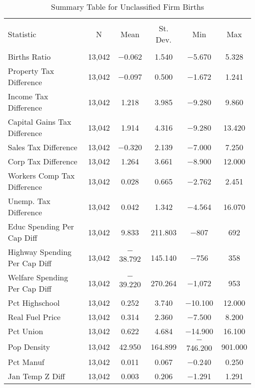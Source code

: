 
\begin{table}[!htbp] \centering 
  \caption{Summary Table for  Unclassified Firm Births} 
  \label{99summary} 
\begin{tabular}{@{\extracolsep{5pt}}lccccc} 
\\[-1.8ex]\hline 
\hline \\[-1.8ex] 
Statistic & \multicolumn{1}{c}{N} & \multicolumn{1}{c}{Mean} & \multicolumn{1}{c}{St. Dev.} & \multicolumn{1}{c}{Min} & \multicolumn{1}{c}{Max} \\ 
\hline \\[-1.8ex] 
Births Ratio & 13,042 & $-$0.062 & 1.540 & $-$5.670 & 5.328 \\ 
Property Tax Difference & 13,042 & $-$0.097 & 0.500 & $-$1.672 & 1.241 \\ 
Income Tax Difference & 13,042 & 1.218 & 3.985 & $-$9.280 & 9.860 \\ 
Capital Gains Tax Difference & 13,042 & 1.914 & 4.316 & $-$9.280 & 13.420 \\ 
Sales Tax Difference & 13,042 & $-$0.320 & 2.139 & $-$7.000 & 7.250 \\ 
Corp Tax Difference & 13,042 & 1.264 & 3.661 & $-$8.900 & 12.000 \\ 
Workers Comp Tax Difference & 13,042 & 0.028 & 0.665 & $-$2.762 & 2.451 \\ 
Unemp. Tax Difference & 13,042 & 0.042 & 1.342 & $-$4.564 & 16.070 \\ 
Educ Spending Per Cap Diff & 13,042 & 9.833 & 211.803 & $-$807 & 692 \\ 
Highway Spending Per Cap Diff & 13,042 & $-$38.792 & 145.140 & $-$756 & 358 \\ 
Welfare Spending Per Cap Diff & 13,042 & $-$39.220 & 270.264 & $-$1,072 & 953 \\ 
Pct Highschool & 13,042 & 0.252 & 3.740 & $-$10.100 & 12.000 \\ 
Real Fuel Price & 13,042 & 0.314 & 2.360 & $-$7.500 & 8.200 \\ 
Pct Union & 13,042 & 0.622 & 4.684 & $-$14.900 & 16.100 \\ 
Pop Density & 13,042 & 42.950 & 164.899 & $-$746.200 & 901.000 \\ 
Pct Manuf & 13,042 & 0.011 & 0.067 & $-$0.240 & 0.250 \\ 
Jan Temp Z Diff & 13,042 & 0.003 & 0.206 & $-$1.291 & 1.291 \\ 

\end{tabular}
\end{table}
